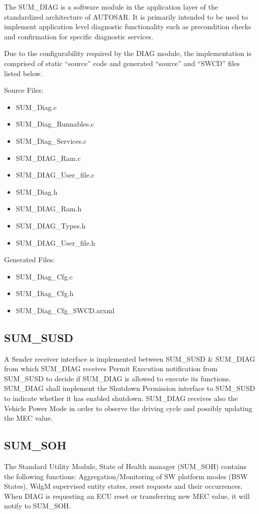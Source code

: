 The SUM_DIAG is a software module in the application layer of the standardized architecture of AUTOSAR.  It is primarily intended to be used to implement application level diagnostic functionality such as precondition checks and confirmation for specific diagnostic services.

Due to the configurability required by the DIAG module, the implementation is comprised of static “source” code and generated “source” and “SWCD” files listed below.

Source Files:
\begin{itemize}
\item  SUM_Diag.c
\item  SUM_Diag_Runnables.c
\item  SUM_Diag_Services.c
\item  SUM_DIAG_Ram.c
\item SUM_DIAG_User_file.c
\item SUM_Diag.h
\item SUM_DIAG_Ram.h
\item SUM_DIAG_Types.h
\item SUM_DIAG_User_file.h
\end{itemize}

Generated Files:
\begin{itemize}
\item SUM_Diag_Cfg.c
\item SUM_Diag_Cfg.h
\item SUM_Diag_Cfg_SWCD.arxml
\end{itemize}

\subsection{SUM_SUSD}

A Sender receiver interface is implemented between SUM_SUSD \& SUM_DIAG from which SUM_DIAG receives Permit Execution notification from SUM_SUSD to decide if SUM_DIAG is allowed to execute its functions. SUM_DIAG shall implement the Shutdown Permission interface to SUM_SUSD to indicate whether it has enabled shutdown. 
SUM_DIAG receives also the Vehicle Power Mode in order to observe the driving cycle and possibly updating the MEC value.

\subsection{SUM_SOH}

The Standard Utility Module, State of Health manager (SUM_SOH) contains the following functions: Aggregation/Monitoring of SW platform modes (BSW States), WdgM supervised entity states, reset requests and their occurrences.
When DIAG is requesting an ECU reset or transferring new MEC value, it will notify to 
SUM_SOH.

